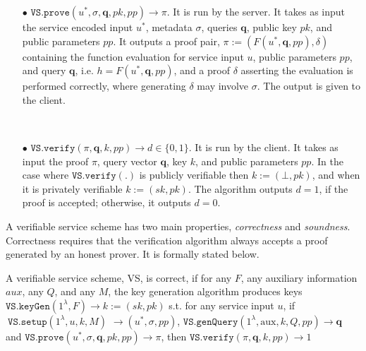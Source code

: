 \begin{definition}[VS Scheme]
\begin{itemize}
\




\item[$\bullet$] $\mathtt{VS.prove}(u^{\scriptscriptstyle *},\sigma, \bm{q}, pk,{pp})\rightarrow \pi$. It is run by the server. It  takes as input the service encoded input $u^{\scriptscriptstyle *}$, metadata $\sigma$,   queries $\bm{q}$, public key $pk$, and { public parameters  $pp$}. It outputs a proof pair, $\pi :=(F(u^{\scriptscriptstyle *}, \bm{q},{pp}),\delta)$ containing the function evaluation for service input $u$, {public parameters $pp$}, and query $\bm{q}$, i.e. $h=F(u^{\scriptscriptstyle *},\bm{q},{pp})$, and a proof $\delta$ asserting the evaluation is performed correctly, where generating $\delta$ may involve $\sigma$. The output is given to the client. 

\

\item[$\bullet$] $\mathtt{VS.verify}(\pi, \bm{q}, k, {pp})\rightarrow d\in\{0,1\}$. It is run by the client. It takes as input the proof $\pi$,   query vector $\bm{q}$,   key  $k$, and {public parameters $pp$}.   In the case where $\mathtt{VS.verify}(.)$ is publicly verifiable then $k:=(\bot,pk)$,  and when it is privately verifiable $k:=(sk,pk)$. The algorithm  outputs $d=1$, if the proof is accepted; otherwise, it outputs $d=0$. 



\end{itemize}
\end{definition}


A verifiable service scheme has two main properties, \emph{correctness} and \emph{soundness}. Correctness requires that  the verification algorithm always accepts a proof generated by an honest prover.  It is formally stated below.

\begin{definition}[VS Correctness] A verifiable service scheme, VS, is  correct,  if for any $F$,  any auxiliary information $aux$, any  $Q$, and any $M$, the key generation algorithm produces keys $\mathtt{VS.keyGen}(1^{\lambda},F)\rightarrow k:=(sk,pk)$ s.t. for any service input $u$, if $\ \mathtt{VS.setup}(1^{\lambda}, u,k,M)$ $\rightarrow (u^{\scriptscriptstyle *},\sigma, {pp})$,  $\mathtt{VS.genQuery}(1^{\lambda}, \text{aux},k,Q, {pp})\rightarrow \bm{q}$ and $\mathtt{VS.prove}(u^{\scriptscriptstyle *},\sigma, \bm{q},pk, {pp})\rightarrow \pi$, then $\mathtt{VS.verify}(\pi, \bm{q}, k, {pp})\rightarrow 1$
\end{definition}

